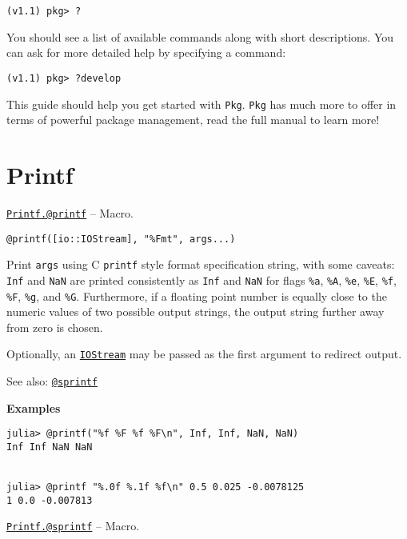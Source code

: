 \begin{verbatim}
(v1.1) pkg> ?
\end{verbatim}

You should see a list of available commands along with short descriptions. You can ask for more detailed help by specifying a command:


\begin{verbatim}
(v1.1) pkg> ?develop
\end{verbatim}

This guide should help you get started with \texttt{Pkg}. \texttt{Pkg} has much more to offer in terms of powerful package management, read the full manual to learn more!



\hypertarget{5039001780758746770}{}


\chapter{Printf}


\hypertarget{13954719910189591998}{} 
\hyperlink{13954719910189591998}{\texttt{Printf.@printf}}  -- {Macro.}

\begin{adjustwidth}{2em}{0pt}


\begin{verbatim}
@printf([io::IOStream], "%Fmt", args...)
\end{verbatim}

Print \texttt{args} using C \texttt{printf} style format specification string, with some caveats: \texttt{Inf} and \texttt{NaN} are printed consistently as \texttt{Inf} and \texttt{NaN} for flags \texttt{\%a}, \texttt{\%A}, \texttt{\%e}, \texttt{\%E}, \texttt{\%f}, \texttt{\%F}, \texttt{\%g}, and \texttt{\%G}. Furthermore, if a floating point number is equally close to the numeric values of two possible output strings, the output string further away from zero is chosen.

Optionally, an \hyperlink{12496894737220238417}{\texttt{IOStream}} may be passed as the first argument to redirect output.

See also: \hyperlink{13977800180580695709}{\texttt{@sprintf}}

\textbf{Examples}


\begin{verbatim}
julia> @printf("%f %F %f %F\n", Inf, Inf, NaN, NaN)
Inf Inf NaN NaN


julia> @printf "%.0f %.1f %f\n" 0.5 0.025 -0.0078125
1 0.0 -0.007813
\end{verbatim}



\end{adjustwidth}
\hypertarget{13977800180580695709}{} 
\hyperlink{13977800180580695709}{\texttt{Printf.@sprintf}}  -- {Macro.}

